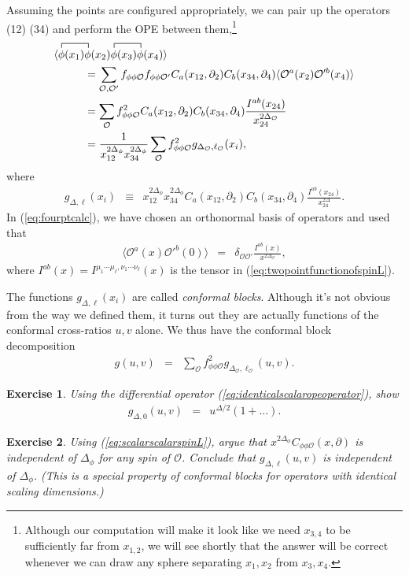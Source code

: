 \documentclass{ws-rv9x6}
\newcommand\be{\begin{eqnarray}}
\newcommand\ee{\end{eqnarray}}
\newcommand\f\phi
\newcommand\cO{\mathcal{O}}
\newcommand\p[1]{\left(#1\right)}
\newcommand\ptl\partial
\newcommand\<\langle
\renewcommand\>\rangle
\newcommand\de\delta
\newcommand\nn{\nonumber}
\renewcommand\.{\cdot}
\newcommand\De{\Delta}
\newtheorem{exercise}{Exercise}[section]
\begin{document}
Assuming the points are configured appropriately, we can pair up the operators (12) (34) and perform the OPE between them,\footnote{Although our computation will make it look like we need $x_{3,4}$ to be sufficiently far from $x_{1,2}$, we will see shortly that the answer will be correct whenever we can draw any sphere separating $x_1,x_2$ from $x_3,x_4$.}
\begin{align}
\label{eq:fourptcalc}
\<
\contraction{}{\f}{(x_1)}{\f}
\f(x_1)&\f(x_2)
\contraction{}{\f}{(x_1)}{\f}
\f(x_3)\f(x_4)
\>\nn\\
&= \sum_{\cO,\cO'}f_{\f\f\cO}f_{\f\f\cO'} C_a(x_{12},\ptl_2)C_b(x_{34},\ptl_4)\<\cO^a(x_2)\cO'^b(x_4)\>\nn\\
&= \sum_\cO f_{\f\f\cO}^2 C_a(x_{12},\ptl_2)C_b(x_{34},\ptl_4)\frac{I^{ab}(x_{24})}{x_{24}^{2\De_\cO}}\nn\\
&= \frac{1}{x_{12}^{2\De_\f} x_{34}^{2\De_\f}}\sum_\cO f_{\f\f\cO}^2 g_{\De_\cO,\ell_\cO}(x_i),
\end{align}
where
\be
\label{eq:olddefinitionofg}
g_{\De,\ell}(x_i) &\equiv& x_{12}^{2\De_\f} x_{34}^{2\De_\f} C_a(x_{12},\ptl_2)C_b(x_{34},\ptl_4)\frac{I^{ab}(x_{24})}{x_{24}^{2\De}}.
\ee
In (\ref{eq:fourptcalc}), we have chosen an orthonormal basis of operators and used that
\be
\label{eq:canonicallynormalizedtwopt}
\<\cO^a(x)\cO'^b(0)\> &=& \de_{\cO\cO'} \frac{I^{ab}(x)}{x^{2\De_\cO}},
\ee
where $I^{ab}(x)=I^{\mu_1\cdots\mu_\ell,\nu_1\cdots\nu_\ell}(x)$ is the tensor in (\ref{eq:twopointfunctionofspinL}).

The functions $g_{\De,\ell}(x_i)$ are called {\it conformal blocks}.  Although it's not obvious from the way we defined them, it turns out they are actually functions of the conformal cross-ratios $u,v$ alone.  We thus have the conformal block decomposition
\be
g(u,v) &=& \sum_\cO f_{\f\f\cO}^2 g_{\De_\cO,\ell_\cO}(u,v).
\ee
\begin{exercise}
Using the differential operator (\ref{eq:identicalscalaropeoperator}), show
\be
\label{eq:boundaryconditionforblock}
g_{\De,0}(u,v) &=& u^{\De/2}\p{1+\dots}.
\ee
\end{exercise}

\begin{exercise}
Using (\ref{eq:scalarscalarspinL}), argue that $x^{2\De_\f} C_{\f\f\cO}(x,\ptl)$ is independent of $\Delta_\phi$ for any spin of $\cO$. Conclude that $g_{\De,\ell}(u,v)$ is independent of $\Delta_\phi$. (This is a special property of conformal blocks for operators with identical scaling dimensions.)
\end{exercise}
\end{document}
